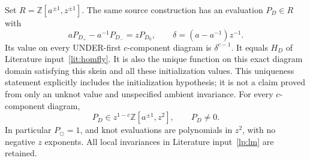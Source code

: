 \begin{theorem}\label{lp:core}
Set $R=\mathbb Z[a^{\pm1},z^{\pm1}]$. The same source construction has
an evaluation $P_D\in R$ with
\begin{equation}\label{lp:skein}
 aP_{D_+}-a^{-1}P_{D_-}=zP_{D_0},
 \qquad \delta=(a-a^{-1})z^{-1}.
\end{equation}
Its value on every UNDER-first $c$-component diagram is $\delta^{c-1}$.
It equals $H_D$ of Literature input~\ref{lit:homfly}. It is also the unique
function on this exact diagram domain satisfying this
skein and all these initialization values. This uniqueness statement
explicitly includes the initialization hypothesis; it is not a claim
proved from only an unknot value and unspecified ambient invariance.
For every $c$-component diagram,
\begin{equation}\label{lp:support}
 P_D\in z^{1-c}\mathbb Z[a^{\pm1},z^2],\qquad P_D\ne0.
\end{equation}
In particular $P_{\bigcirc}=1$, and knot evaluations are polynomials in
$z^2$, with no negative $z$ exponents. All local invariances in
Literature input~\ref{lp:lm} are retained.
\end{theorem}

